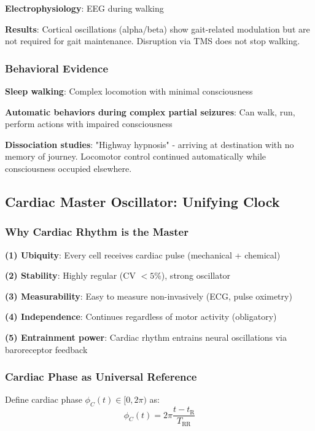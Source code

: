 \documentclass[11pt,onecolumn]{article}
\begin{document}
\textbf{Electrophysiology}: EEG during walking

\textbf{Results}: Cortical oscillations (alpha/beta) show gait-related modulation but are not required for gait maintenance. Disruption via TMS does not stop walking.

\subsubsection{Behavioral Evidence}

\textbf{Sleep walking}: Complex locomotion with minimal consciousness

\textbf{Automatic behaviors during complex partial seizures}: Can walk, run, perform actions with impaired consciousness

\textbf{Dissociation studies}: "Highway hypnosis" - arriving at destination with no memory of journey. Locomotor control continued automatically while consciousness occupied elsewhere.

\subsection{Cardiac Master Oscillator: Unifying Clock}

\subsubsection{Why Cardiac Rhythm is the Master}

\textbf{(1) Ubiquity}: Every cell receives cardiac pulse (mechanical + chemical)

\textbf{(2) Stability}: Highly regular (CV $< 5$\%), strong oscillator

\textbf{(3) Measurability}: Easy to measure non-invasively (ECG, pulse oximetry)

\textbf{(4) Independence}: Continues regardless of motor activity (obligatory)

\textbf{(5) Entrainment power}: Cardiac rhythm entrains neural oscillations via baroreceptor feedback

\subsubsection{Cardiac Phase as Universal Reference}

Define cardiac phase $\phi_C(t) \in [0, 2\pi)$ as:
\begin{equation}
\phi_C(t) = 2\pi\frac{t - t_{\text{R}}}{T_{\text{RR}}}
\end{equation}
\end{document}
